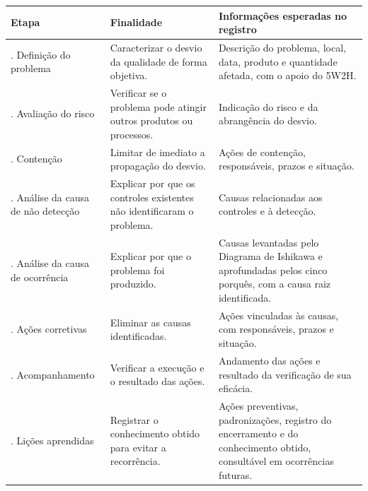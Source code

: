 \begin{quadro}[htb]
    \centering
    \caption{Etapas do QRQC adotadas como referência para a análise}
    \label{quad:referencia-qrqc}
    \footnotesize
    \begin{tabularx}{\textwidth}{|>{\raggedright\arraybackslash}p{3.3cm}
                                    |>{\raggedright\arraybackslash}X
                                    |>{\raggedright\arraybackslash}X|}
        \hline
        \textbf{Etapa} & \textbf{Finalidade} & \textbf{Informações esperadas no registro} \\
        \hline
        1. Definição do problema & Caracterizar o desvio da qualidade de forma objetiva. & Descrição do problema, local, data, produto e quantidade afetada, com o apoio do 5W2H. \\
        \hline
        2. Avaliação do risco & Verificar se o problema pode atingir outros produtos ou processos. & Indicação do risco e da abrangência do desvio. \\
        \hline
        3. Contenção & Limitar de imediato a propagação do desvio. & Ações de contenção, responsáveis, prazos e situação. \\
        \hline
        4. Análise da causa de não detecção & Explicar por que os controles existentes não identificaram o problema. & Causas relacionadas aos controles e à detecção. \\
        \hline
        5. Análise da causa de ocorrência & Explicar por que o problema foi produzido. & Causas levantadas pelo Diagrama de Ishikawa e aprofundadas pelos cinco porquês, com a causa raiz identificada. \\
        \hline
        6. Ações corretivas & Eliminar as causas identificadas. & Ações vinculadas às causas, com responsáveis, prazos e situação. \\
        \hline
        7. Acompanhamento & Verificar a execução e o resultado das ações. & Andamento das ações e resultado da verificação de sua eficácia. \\
        \hline
        8. Lições aprendidas & Registrar o conhecimento obtido para evitar a recorrência. & Ações preventivas, padronizações, registro do encerramento e do conhecimento obtido, consultável em ocorrências futuras. \\
        \hline
    \end{tabularx}
\end{quadro}

